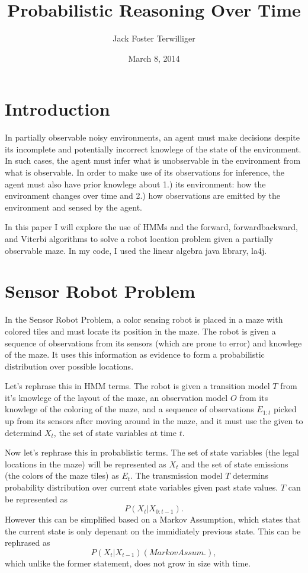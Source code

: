 \documentclass[a4paper]{article}
\title{Probabilistic Reasoning Over Time}
\author{Jack Foster Terwilliger}
\date{March 8, 2014}
\begin{document}
\maketitle

\section{Introduction}

In partially observable noisy environments, an agent must make decisions despite its incomplete and potentially incorrect knowlege of the state of the environment. In such cases, the agent must infer what is unobservable in the environment from what is observable. In order to make use of its observations for inference, the agent must also have prior knowlege about 1.) its environment: how the environment changes over time and 2.) how observations are emitted by the environment and sensed by the agent. 

In this paper I will explore the use of HMMs and the forward, forwardbackward, and Viterbi algorithms to solve a robot location problem given a partially observable maze. In my code, I used the linear algebra java library, la4j.


\section{Sensor Robot Problem}

In the Sensor Robot Problem, a color sensing robot is placed in a maze with colored tiles and must locate its position in the maze. The robot is given a sequence of observations from its sensors (which are prone to error) and knowlege of the maze. It uses this information as evidence to form a probabilistic distribution over possible locations.

Let's rephrase this in HMM terms. The robot is given a transition model $T$ from it's knowlege of the layout of the maze, an observation model $O$ from its knowlege of the coloring of the maze, and a sequence of observations $E_{1:t}$ picked up from its sensors after moving around in the maze, and it must use the given to determind $X_t$, the set of state variables at time $t$.

Now let's rephrase this in probablistic terms. The set of state variables (the legal locations in the maze) will be represented as $X_t$ and the set of state emissions (the colors of the maze tiles) as $E_t$. The transmission model $T$ determins probability distribution over current state variables given past state values. $T$ can be represented as 
\begin{equation}
P(X_t|X_{0:t-1}).
\end{equation}
However this can be simplified based on a Markov Assumption, which states that the current state is only depenant on the immidiately previous state. This can be rephrased as 
\begin{equation}
P(X_t|X_{t-1}) (Markov Assum.),
\end{equation}
which unlike the former statement, does not grow in size with time. 
\end{document}
